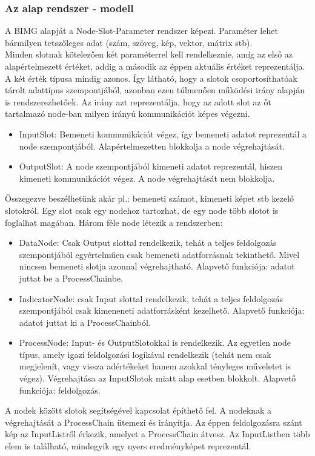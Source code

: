 \documentclass[a4paper,12pt,oneside]{report}
\begin{document}
\subsubsection{Az alap rendszer - modell}
A BIMG alapját a Node-Slot-Parameter rendszer képezi. Paraméter lehet bármilyen tetszőleges adat (szám, szöveg, kép, vektor, mátrix stb).\\ Minden slotnak kötelezően két paraméterrel kell rendelkeznie, amíg az első az alapértelmezett értéket, addig a második az éppen aktuális értéket reprezentálja. A két érték típusa mindig azonos. Így látható, hogy a slotok csoportosíthatóak  tárolt adattípus szempontjából, azonban ezen túlmenően működési irány alapján is rendszerezhetőek. Az irány azt reprezentálja, hogy az adott slot az őt tartalmazó node-ban milyen irányú kommunikációt képes végezni.
\begin{itemize}
	\itemsep0em
	\item InputSlot: Bemeneti kommunikációt végez, így bemeneti adatot reprezentál a node szempontjából. Alapértelmezetten blokkolja a node végrehajtását.
	\item OutputSlot: A node szempontjából kimeneti adatot reprezentál, hiszen kimeneti kommunikációt végez. A node végrehajtását nem blokkolja.
\end{itemize}
Összegezve beszélhetünk akár pl.: bemeneti számot, kimeneti képet stb kezelő slotokról. Egy slot csak egy nodehoz tartozhat, de egy node több slotot is foglalhat magában.
Három féle node létezik a rendszerben:
\begin{itemize}
	\itemsep0em
	\item DataNode: Csak Output slottal rendelkezik, tehát a teljes feldolgozás szempontjából egyértelműen csak bemeneti adatforrásnak tekinthető. Mivel nincsen bemeneti slotja azonnal végrehajtható. Alapvető funkciója: adatot juttat be a ProcessChainbe.
	\item IndicatorNode: csak Input slottal rendelkezik, tehát a teljes feldolgozás szempontjából csak kimeneneti adatforrásként kezelhető. Alapvető funkciója: adatot juttat ki a ProcessChainból.
	\item ProcessNode: Input- és OutputSlotokkal is rendelkezik. Az egyetlen node típus, amely igazi feldolgozási logikával rendelkezik (tehát nem csak megjelenít, vagy vissza adértékeket hanem azokkal tényleges műveletet is végez). Végrehajtása az InputSlotok miatt alap esetben blokkolt. Alapvető funkciója: feldolgozás.

\end{itemize}
A nodek között slotok segítségével kapcsolat építhető fel. A nodeknak a végrehajtását a ProcessChain ütemezi és irányítja. Az éppen feldolgozásra szánt kép az InputListről érkezik, amelyet a ProcessChain átvesz. Az InputListben több elem is található, mindegyik egy nyers eredményképet reprezentál.\\
\end{document}
